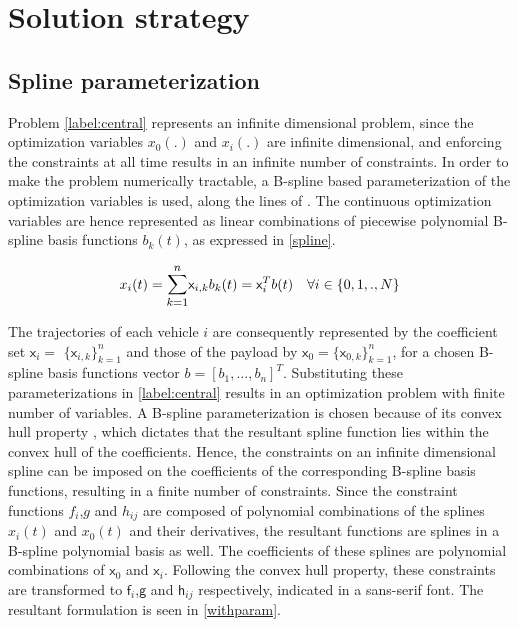 \documentclass[letterpaper, 10 pt, conference]{ieeeconf}
\newcommand{\cx}{\textsf{x}}
\newcommand{\cf}{\textsf{f}}
\newcommand{\cg}{\textsf{g}}
\newcommand{\ch}{\textsf{h}}
\begin{document}
\section{Solution strategy}
\subsection{Spline parameterization}
Problem \eqref{label:central} represents an infinite dimensional problem, since the optimization variables $x_0(.)$ and $x_i(.)$ are infinite dimensional, and enforcing the constraints at all time results in an infinite number of constraints. In order to make the problem numerically tractable, a B-spline based parameterization of the optimization variables is used, along the lines of \cite{c15}. The continuous optimization variables are hence represented as linear combinations of piecewise polynomial B-spline basis functions $b_k(t)$, as expressed in \eqref{spline}.

\begin{equation}\label{spline}
x_i(t) = \mathlarger{\sum\limits_{k=1}^{n}} \cx_{i,k}b_k(t) = \cx_i^Tb(t) \quad \forall i \in \{0,1,.,N\}
\end{equation}

 The trajectories of each vehicle $i$ are consequently represented by the coefficient set $\cx_i$$=$ $\{\cx_{i,k}\}_{k=1}^{n}$ and those of the payload by $\cx_0$$=$$\{\cx_{0,k}\}_{k=1}^{n}$, for a chosen B-spline basis functions vector $b = [b_1,\ldots,b_n]^T$. Substituting these parameterizations in \eqref{label:central} results in an optimization problem with finite number of variables. A B-spline parameterization is chosen because of its convex hull property \cite{c15}, which dictates that the resultant spline function lies within the convex hull of the coefficients. Hence, the constraints on an infinite dimensional spline can be imposed on the coefficients of the corresponding B-spline basis functions, resulting in a finite number of constraints. Since the constraint functions $f_i$,$g$ and $h_{ij}$ are composed of polynomial combinations of the splines $x_i(t)$ and $x_0(t)$ and their derivatives, the resultant functions are splines in a B-spline polynomial basis as well. The coefficients of these splines are polynomial combinations of $\cx_0$ and $\cx_i$. Following the convex hull property, these constraints are transformed to $\cf_i$,$\cg$ and $\ch_{ij}$ respectively, indicated in a sans-serif font.
The resultant formulation is seen in \eqref{withparam}. 
\end{document}
